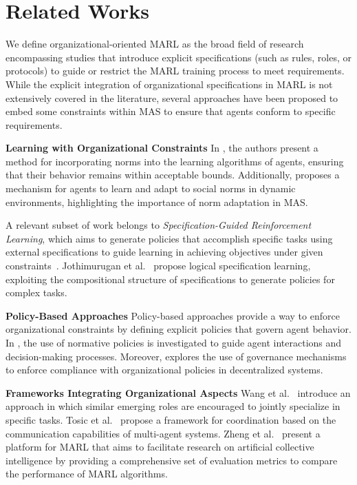 \documentclass[conference]{IEEEtran}
\begin{document}
\section{Related Works}
\label{sec:related_works}

We define organizational-oriented MARL as the broad field of research encompassing studies that introduce explicit specifications (such as rules, roles, or protocols) to guide or restrict the MARL training process to meet requirements. While the explicit integration of organizational specifications in MARL is not extensively covered in the literature, several approaches have been proposed to embed some constraints within MAS to ensure that agents conform to specific requirements.

\textbf{Learning with Organizational Constraints} \quad
In \cite{cruz2020norms}, the authors present a method for incorporating norms into the learning algorithms of agents, ensuring that their behavior remains within acceptable bounds. Additionally, \cite{villatoro2011social} proposes a mechanism for agents to learn and adapt to social norms in dynamic environments, highlighting the importance of norm adaptation in MAS.

A relevant subset of work belongs to \emph{Specification-Guided Reinforcement Learning}, which aims to generate policies that accomplish specific tasks using external specifications to guide learning in achieving objectives under given constraints~\cite{Bansal2022}. Jothimurugan et al.~\cite{Jothimurugan2021} propose logical specification learning, exploiting the compositional structure of specifications to generate policies for complex tasks.

\textbf{Policy-Based Approaches} \quad
Policy-based approaches provide a way to enforce organizational constraints by defining explicit policies that govern agent behavior. In \cite{krupanski2015norm}, the use of normative policies is investigated to guide agent interactions and decision-making processes. Moreover, \cite{vos2020governing} explores the use of governance mechanisms to enforce compliance with organizational policies in decentralized systems.

\textbf{Frameworks Integrating Organizational Aspects} \quad
Wang et al.~\cite{Wang2020} introduce an approach in which similar emerging roles are encouraged to jointly specialize in specific tasks. Tosic et al.~\cite{Tosic2010} propose a framework for coordination based on the communication capabilities of multi-agent systems. Zheng et al.~\cite{Zheng2018} present a platform for MARL that aims to facilitate research on artificial collective intelligence by providing a comprehensive set of evaluation metrics to compare the performance of MARL algorithms.
\end{document}
